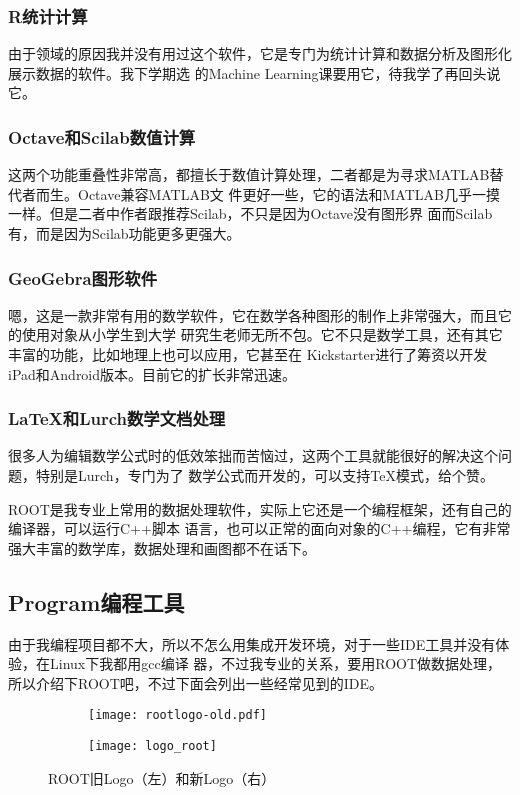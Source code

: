 \documentclass[11pt,fleqn]{book} %
\begin{document}
\subsubsection{R统计计算}
由于领域的原因我并没有用过这个软件，它是专门为统计计算和数据分析及图形化展示数据的软件。我下学期选
的Machine Learning课要用它，待我学了再回头说它。
\subsubsection{Octave和Scilab数值计算}
这两个功能重叠性非常高，都擅长于数值计算处理，二者都是为寻求MATLAB替代者而生。Octave兼容MATLAB文
件更好一些，它的语法和MATLAB几乎一摸一样。但是二者中作者跟推荐Scilab，不只是因为Octave没有图形界
面而Scilab有，而是因为Scilab功能更多更强大。
\subsubsection{GeoGebra图形软件}
嗯，这是一款非常有用的数学软件，它在数学各种图形的制作上非常强大，而且它的使用对象从小学生到大学
研究生老师无所不包。它不只是数学工具，还有其它丰富的功能，比如地理上也可以应用，它甚至在
Kickstarter进行了筹资以开发iPad和Android版本。目前它的扩长非常迅速。
\subsubsection{\LaTeX 和Lurch数学文档处理}
很多人为编辑数学公式时的低效笨拙而苦恼过，这两个工具就能很好的解决这个问题，特别是Lurch，专门为了
数学公式而开发的，可以支持\TeX 模式，给个赞。
\begin{tips}
  ROOT是我专业上常用的数据处理软件，实际上它还是一个编程框架，还有自己的编译器，可以运行C++脚本
  语言，也可以正常的面向对象的C++编程，它有非常强大丰富的数学库，数据处理和画图都不在话下。
\end{tips}
\subsection{Program编程工具}
由于我编程项目都不大，所以不怎么用集成开发环境，对于一些IDE工具并没有体验，在Linux下我都用gcc编译
器，不过我专业的关系，要用ROOT做数据处理，所以介绍下ROOT吧，不过下面会列出一些经常见到的IDE。

\vspace{-2.2cm}
\begin{figure}[!h]
  \centering
  \begin{subfigure}{0.4\textwidth}
    \texttt{[image: rootlogo-old.pdf]}
  \end{subfigure}
  \begin{subfigure}{0.45\textwidth}
    \texttt{[image: logo\_root]}
  \end{subfigure}
  \vspace{-1.8cm}
  \caption{ROOT旧Logo（左）和新Logo（右）}
\end{figure}
\end{document}
